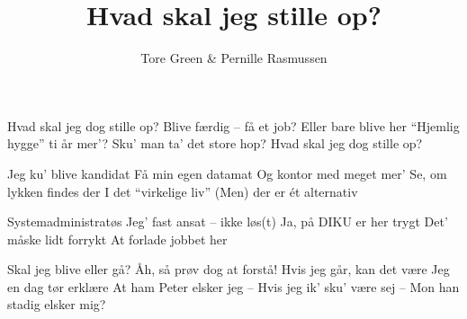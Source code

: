 \documentclass[10pt]{article}
\title{Hvad skal jeg stille op?}
\author{Tore Green \& Pernille Rasmussen}
\begin{document}

\begin{song}
 Hvad skal jeg dog stille op?
Blive færdig -- få et job?
Eller bare blive her
``Hjemlig hygge'' ti år mer'?
Sku' man ta' det store hop?
Hvad skal jeg dog stille op?

Jeg ku' blive kandidat
Få min egen datamat
Og kontor med meget mer'
Se, om lykken findes der
I det ``virkelige liv''
(Men) der er \' et alternativ

Systemadministratøs
Jeg' fast ansat -- ikke løs(t)
Ja, på DIKU er her trygt
Det' måske lidt forrykt
At forlade jobbet her

Skal jeg blive eller gå?
Åh, så prøv dog at forstå!
Hvis jeg går, kan det være
Jeg en dag tør erklære
At ham Peter elsker jeg
-- Hvis jeg ik' sku' være sej --
Mon han stadig elsker mig?

\end{song}
\end{document}
